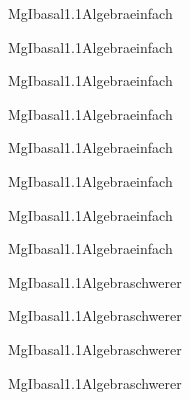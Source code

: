 \documentclass[12pt]{article}
\begin{document}
\begin{Add}{MgI}{basal1.1}{Algebra}{einfach}
\solution{ }
\end{Add}
\begin{Add}{MgI}{basal1.1}{Algebra}{einfach}
\end{Add}

\begin{Add}{MgI}{basal1.1}{Algebra}{einfach}
\solution{ }
\end{Add}
\begin{Add}{MgI}{basal1.1}{Algebra}{einfach}
\end{Add}

\begin{Add}{MgI}{basal1.1}{Algebra}{einfach}
\solution{ }
\end{Add}
\begin{Add}{MgI}{basal1.1}{Algebra}{einfach}
\end{Add}

\begin{Add}{MgI}{basal1.1}{Algebra}{einfach}
\solution{ }
\end{Add}
\begin{Add}{MgI}{basal1.1}{Algebra}{einfach}
\end{Add}

\begin{Add}{MgI}{basal1.1}{Algebra}{schwerer}
\solution{ }
\end{Add}
\begin{Add}{MgI}{basal1.1}{Algebra}{schwerer}
\end{Add}

\begin{Add}{MgI}{basal1.1}{Algebra}{schwerer}
\solution{ }
\end{Add}
\begin{Add}{MgI}{basal1.1}{Algebra}{schwerer}
\end{Add}
\end{document}
